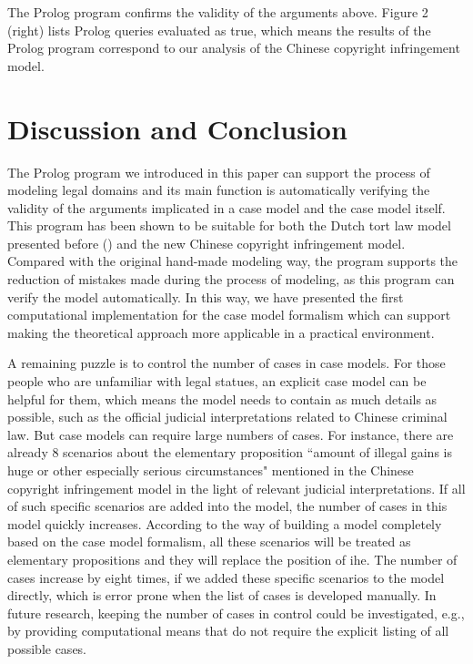\documentclass{IOS-Book-Article}
\begin{document}
\noindent The Prolog program confirms the validity of the arguments above. Figure 2 (right) lists Prolog queries evaluated as true, which means the results of the Prolog program correspond to our analysis of the Chinese copyright infringement model.

\section{Discussion and Conclusion}

\noindent 
The Prolog program we introduced in this paper can support the process of modeling legal domains and its main function is automatically verifying the validity of the arguments implicated in a case model and the case model itself. This program has been shown to be suitable for both the Dutch tort law model presented before (\cite{Verheij2017Formalizing}) and the new Chinese copyright infringement model. Compared with the original hand-made modeling way, the program supports the reduction of mistakes made during the process of modeling, as this program can verify the model automatically. In this way, we have presented the first computational implementation for the case model formalism which can support making the theoretical approach more applicable in a practical environment. 

A remaining puzzle is to control the number of cases in case models. For those people who are unfamiliar with legal statues, an explicit case model can be helpful for them, which means the model needs to contain as much details as possible, such as the official judicial interpretations related to Chinese criminal law. But case models can require large numbers of cases. For instance, there are already 8 scenarios about the elementary proposition ``amount of illegal gains is huge or other especially serious circumstances" mentioned in the Chinese copyright infringement model in the light of relevant judicial interpretations. If all of such specific scenarios are added into the model, the number of cases in this model quickly increases. According to the way of building a model completely based on the case model formalism, all these scenarios will be treated as elementary propositions and they will replace the position of  $\textrm{ihe}$. The number of cases increase by eight times, if we added these specific scenarios to the model directly, which is error prone when the list of cases is developed manually. In future research, keeping the number of cases in control could be investigated, e.g., by providing computational means that do not require the explicit listing of all possible cases. 
\end{document}
